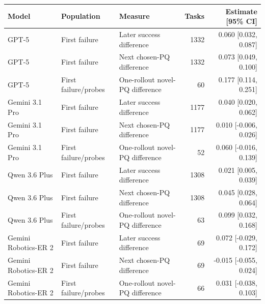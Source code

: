 \begin{tabular}{lllrr}
\toprule
Model & Population & Measure & Tasks & Estimate [95\% CI] \\
\midrule
GPT-5 & First failure & Later success difference & 1332 & 0.060 [0.032, 0.087] \\
GPT-5 & First failure & Next chosen-PQ difference & 1332 & 0.073 [0.049, 0.100] \\
GPT-5 & First failure/probes & One-rollout novel-PQ difference & 60 & 0.177 [0.114, 0.251] \\
Gemini 3.1 Pro & First failure & Later success difference & 1177 & 0.040 [0.020, 0.062] \\
Gemini 3.1 Pro & First failure & Next chosen-PQ difference & 1177 & 0.010 [-0.006, 0.026] \\
Gemini 3.1 Pro & First failure/probes & One-rollout novel-PQ difference & 52 & 0.060 [-0.016, 0.139] \\
Qwen 3.6 Plus & First failure & Later success difference & 1308 & 0.021 [0.005, 0.039] \\
Qwen 3.6 Plus & First failure & Next chosen-PQ difference & 1308 & 0.045 [0.028, 0.064] \\
Qwen 3.6 Plus & First failure/probes & One-rollout novel-PQ difference & 63 & 0.099 [0.032, 0.168] \\
Gemini Robotics-ER 2 & First failure & Later success difference & 69 & 0.072 [-0.029, 0.172] \\
Gemini Robotics-ER 2 & First failure & Next chosen-PQ difference & 69 & -0.015 [-0.055, 0.024] \\
Gemini Robotics-ER 2 & First failure/probes & One-rollout novel-PQ difference & 66 & 0.031 [-0.038, 0.103] \\
\bottomrule
\end{tabular}
